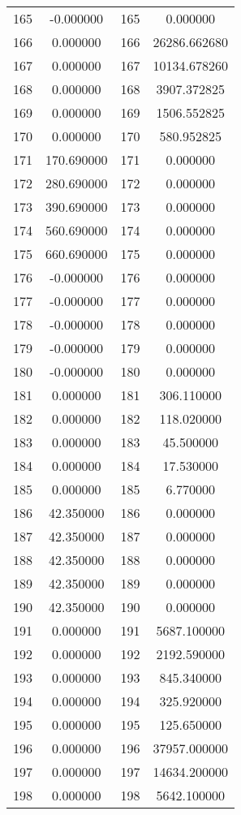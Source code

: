 \documentclass[12pt]{article}
\begin{document}
\begin{longtable}{@{}cccc@{}}
165 & -0.000000 & 165 & 0.000000 \\
166 & 0.000000 & 166 & 26286.662680 \\
167 & 0.000000 & 167 & 10134.678260 \\
168 & 0.000000 & 168 & 3907.372825 \\
169 & 0.000000 & 169 & 1506.552825 \\
170 & 0.000000 & 170 & 580.952825 \\
171 & 170.690000 & 171 & 0.000000 \\
172 & 280.690000 & 172 & 0.000000 \\
173 & 390.690000 & 173 & 0.000000 \\
174 & 560.690000 & 174 & 0.000000 \\
175 & 660.690000 & 175 & 0.000000 \\
176 & -0.000000 & 176 & 0.000000 \\
177 & -0.000000 & 177 & 0.000000 \\
178 & -0.000000 & 178 & 0.000000 \\
179 & -0.000000 & 179 & 0.000000 \\
180 & -0.000000 & 180 & 0.000000 \\
181 & 0.000000 & 181 & 306.110000 \\
182 & 0.000000 & 182 & 118.020000 \\
183 & 0.000000 & 183 & 45.500000 \\
184 & 0.000000 & 184 & 17.530000 \\
185 & 0.000000 & 185 & 6.770000 \\
186 & 42.350000 & 186 & 0.000000 \\
187 & 42.350000 & 187 & 0.000000 \\
188 & 42.350000 & 188 & 0.000000 \\
189 & 42.350000 & 189 & 0.000000 \\
190 & 42.350000 & 190 & 0.000000 \\
191 & 0.000000 & 191 & 5687.100000 \\
192 & 0.000000 & 192 & 2192.590000 \\
193 & 0.000000 & 193 & 845.340000 \\
194 & 0.000000 & 194 & 325.920000 \\
195 & 0.000000 & 195 & 125.650000 \\
196 & 0.000000 & 196 & 37957.000000 \\
197 & 0.000000 & 197 & 14634.200000 \\
198 & 0.000000 & 198 & 5642.100000 \\

\end{longtable}
\end{document}
